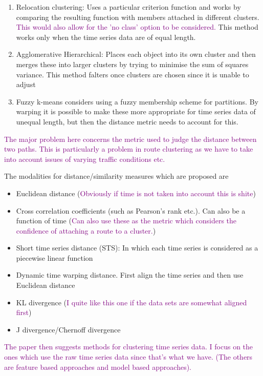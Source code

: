 \documentclass{report}
\newcommand\NOTE[1]{\textcolor{purple}{#1}}
\begin{document}
    \begin{enumerate}
        \item Relocation clustering: Uses a particular criterion function and works by comparing the resulting function with members attached in different clusters. \NOTE{This would also allow for the 'no class' option to be considered.} This method works only when the time series data are of equal length.
        \item Agglomerative Hierarchical: Places each object into its own cluster and then merges these into larger clusters by trying to minimise the sum of squares variance. This method falters once clusters are chosen since it is unable to adjust
        \item Fuzzy k-means considers using a fuzzy membership scheme for partitions. By warping it is possible to make these more appropriate for time series data of unequal length, but then the distance metric needs to account for this.
    \end{enumerate}

    \NOTE{The major problem here concerns the metric used to judge the distance between two paths. This is particularly a problem in route clustering as we have to take into account issues of varying traffic conditions etc.}

    The modalities for distance/similarity measures which are proposed are

    \begin{itemize}
        \item Euclidean distance (\NOTE{Obviously if time is not taken into account this is shite})
        \item Cross correlation coefficients (such as Pearson's rank etc.). Can also be a function of time (\NOTE{Can also use these as the metric which considers the confidence of attaching a route to a cluster.})
        \item Short time series distance (STS): In which each time series is considered as a piecewise linear function
        \item Dynamic time warping distance. First align the time series and then use Euclidean distance
        \item KL divergence (\NOTE{I quite like this one if the data sets are somewhat aligned first})
        \item J divergence/Chernoff divergence
    \end{itemize}

    \NOTE{The paper then suggests methods for clustering time series data. I focus on the ones which use the raw time series data since that's what we have. (The others are feature based approaches and model based approaches).}
\end{document}
